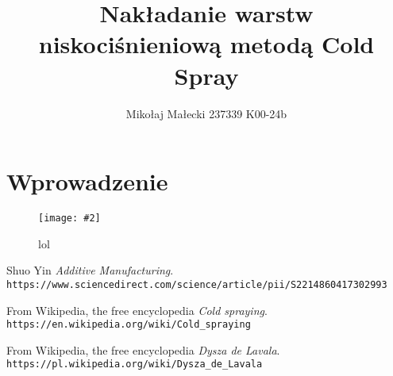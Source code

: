 \documentclass[13pt]{article}
\title{Nakładanie warstw niskociśnieniową metodą Cold Spray}
\author{Mikołaj Małecki 237339 K00-24b}
\newcommand{\fig}[3]{
\begin{figure}[!h]
	\centering
	\texttt{[image: \#2]}
	\caption{#3}
\end{figure}
}
\begin{document}
	\maketitle
\section{Wprowadzenie}
\fig{0.8}{bef.jpg}{lol}


\begin{thebibliography}{9}
Shuo Yin
\textit{Additive Manufacturing}. 
\\\texttt{https://www.sciencedirect.com/science/article/pii/S2214860417302993}


From Wikipedia, the free encyclopedia
\textit{Cold spraying}. 
\\\texttt{https://en.wikipedia.org/wiki/Cold\_spraying}

From Wikipedia, the free encyclopedia
\textit{Dysza de Lavala}. 
\\\texttt{https://pl.wikipedia.org/wiki/Dysza\_de\_Lavala}
\end{thebibliography}
\end{document}
